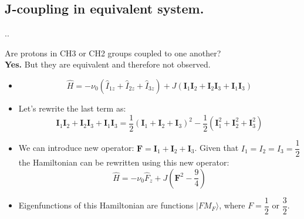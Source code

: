 \documentclass[handout]{beamer}
\begin{document}
\subsection{J-coupling in equivalent system.}
\begin{frame}{\thesection.\thesubsection. \insertsubsection}

Are protons in CH3 or CH2 groups coupled to one another? \\
\textbf{Yes.} But they are equivalent and therefore not observed.

\begin{itemize}[<+>]
	\item 
	
	\begin{equation}
	\hat{H} = - \nu_0 (\hat{I}_{1z} + \hat{I}_{2z}+ \hat{I}_{3z}) + J (\bm{I}_1 \bm{I}_2 + \bm{I}_2 \bm{I}_3  + \bm{I}_1 \bm{I}_3 )
	\end{equation}
	
	\item
	Let's rewrite the last term as:
	\begin{equation}
	\bm{I}_1 \bm{I}_2 + \bm{I}_2 \bm{I}_3  + \bm{I}_1 \bm{I}_3 = \dfrac{1}{2} (\bm{I}_1 + \bm{I}_2 + \bm{I}_3 )^2 - \dfrac{1}{2} ( \bm{I}_1^2 + \bm{I}_2^2 + \bm{I}_3^2)
	\end{equation}
	
	\item	
	We can introduce new operator: $\bm{F} =\bm{I}_1 + \bm{I}_2 + \bm{I}_3$. Given that $I_1=I_2=I_3=\dfrac{1}{2}$ the Hamiltonian can be rewritten using this new operator:
	\begin{equation}
	\hat{H} = - \nu_0 \hat{F}_{z} + J (\bm{F}^2 - \dfrac{9}{4} )    
	\end{equation}
	
	\item	
	Eigenfunctions of this Hamiltonian are functions $\vert F M_F \rangle$, where $F=\dfrac{1}{2}$ or $\dfrac{3}{2}$.
\end{itemize}

\end{frame}
\end{document}
